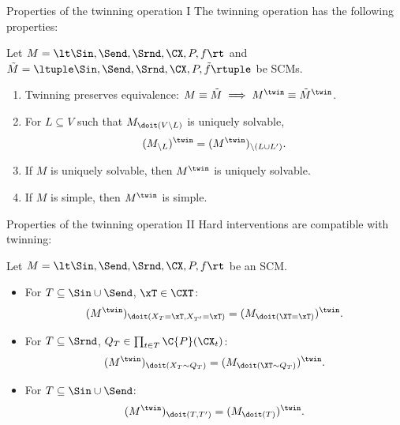 \begin{frame}{Properties of the twinning operation I}
The twinning operation has the following properties:
\begin{Prp}
Let $M = \lt \Sin, \Send, \Srnd, \CX, P, f \rt$ and $\tilde{M} = \ltuple \Sin, \Send, \Srnd, \CX, P, \tilde{f} \rtuple$ be SCMs.
  \begin{enumerate}
\item Twinning preserves equivalence: $M \equiv \tilde{M} \implies M^\twin \equiv \tilde{M}^\twin$.
\item 
For $L \subseteq V$ such that $M_{\doit(V\setminus L)}$ is uniquely solvable,
$$(M_{\setminus L})^\twin = (M^\twin)_{\setminus (L\cup L')}.$$
\item If $M$ is uniquely solvable, then $M^{\twin}$ is uniquely solvable.
\item If $M$ is simple, then $M^{\twin}$ is simple.
\end{enumerate}
\end{Prp}
\end{frame}

\begin{frame}{Properties of the twinning operation II}
Hard interventions are compatible with twinning:
\begin{Prp}
Let $M = \lt \Sin, \Send, \Srnd, \CX, P, f \rt$ be an SCM.
\begin{itemize}
  \item For $T \subseteq \Sin \cup \Send$, $\xT \in \CXT$:
    $$(M^\twin)_{\doit(X_T=\xT,X_{T'}=\xT)} = (M_{\doit(\XT=\xT)})^\twin.$$
  \item For $T \subseteq \Srnd$, $Q_T \in \prod_{t\in T} \C{P}(\CX_t)$:
    $$(M^\twin)_{\doit(X_T\sim Q_T)} = (M_{\doit(\XT\sim Q_T)})^\twin.$$
  \item For $T \subseteq \Sin \cup \Send$:
    $$(M^\twin)_{\doit(T,T')} = (M_{\doit(T)})^\twin.$$
\end{itemize}
\end{Prp}
\end{frame}

